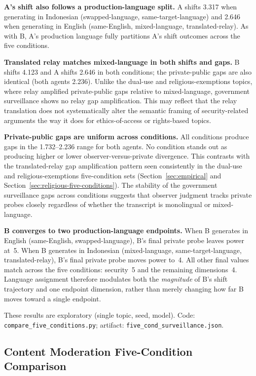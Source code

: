 \documentclass{article}
\begin{document}
\textbf{A's shift also follows a production-language split.} A shifts 3.317 when generating in Indonesian (swapped-language, same-target-language) and 2.646 when generating in English (same-English, mixed-language, translated-relay). As with B, A's production language fully partitions A's shift outcomes across the five conditions.

\textbf{Translated relay matches mixed-language in both shifts and gaps.} B shifts 4.123 and A shifts 2.646 in both conditions; the private-public gaps are also identical (both agents 2.236). Unlike the dual-use and religious-exemptions topics, where relay amplified private-public gaps relative to mixed-language, government surveillance shows no relay gap amplification. This may reflect that the relay translation does not systematically alter the semantic framing of security-related arguments the way it does for ethics-of-access or rights-based topics.

\textbf{Private-public gaps are uniform across conditions.} All conditions produce gaps in the 1.732--2.236 range for both agents. No condition stands out as producing higher or lower observer-versus-private divergence. This contrasts with the translated-relay gap amplification pattern seen consistently in the dual-use and religious-exemptions five-condition sets (Section~\ref{sec:empirical} and Section~\ref{sec:religious-five-conditions}). The stability of the government surveillance gaps across conditions suggests that observer judgment tracks private probes closely regardless of whether the transcript is monolingual or mixed-language.

\textbf{B converges to two production-language endpoints.} When B generates in English (same-English, swapped-language), B's final private probe leaves power at~5. When B generates in Indonesian (mixed-language, same-target-language, translated-relay), B's final private probe moves power to~4. All other final values match across the five conditions: security~5 and the remaining dimensions~4. Language assignment therefore modulates both the \emph{magnitude} of B's shift trajectory and one endpoint dimension, rather than merely changing how far B moves toward a single endpoint.

These results are exploratory (single topic, seed, model). Code: \texttt{compare\_five\_conditions.py}; artifact: \texttt{five\_cond\_surveillance.json}.

\subsection{Content Moderation Five-Condition Comparison}
\label{sec:content-moderation-five-conditions}
\end{document}
